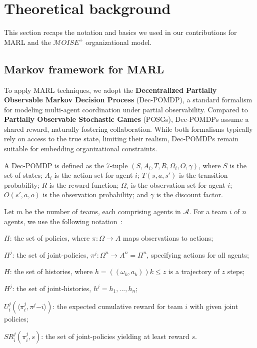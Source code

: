 \documentclass[pdflatex,sn-mathphys-num]{sn-jnl}%
\theoremstyle{thmstyleone}%
\theoremstyle{thmstyletwo}%
\theoremstyle{thmstylethree}%
\begin{document}


\section{Theoretical background}\label{sec:background}

This section recaps the notation and basics we used in our contributions for MARL and the $\mathcal{M}OISE^+$ organizational model.

\subsection{Markov framework for MARL}

To apply MARL techniques, we adopt the \textbf{Decentralized Partially Observable Markov Decision Process} (Dec-POMDP)\cite{Oliehoek2016}, a standard formalism for modeling multi-agent coordination under partial observability. Compared to \textbf{Partially Observable Stochastic Games} (POSGs), Dec-POMDPs assume a shared reward, naturally fostering collaboration\cite{Matignon2007}. While both formalisms typically rely on access to the true state, limiting their realism, Dec-POMDPs remain suitable for embedding organizational constraints.

A Dec-POMDP is defined as the 7-tuple $\left(S, {A_i}, T, R, {\Omega_i}, O, \gamma \right)$, where $S$ is the set of states; $A_i$ is the action set for agent $i$; $T(s, a, s')$ is the transition probability; $R$ is the reward function; $\Omega_i$ is the observation set for agent $i$; $O(s', a, o)$ is the observation probability; and $\gamma$ is the discount factor.

Let $m$ be the number of teams, each comprising agents in $\mathcal{A}$. For a team $i$ of $n$ agents, we use the following notation~\cite{Matignon2007,Yuan2023}:
%
\begin{enumerate*}[label={\roman*)}, itemjoin={; \quad}]
    \item $\Pi$: the set of policies, where $\pi: \Omega \rightarrow A$ maps observations to actions;
    \item $\Pi^j$: the set of joint-policies, $\pi^j: \Omega^n \rightarrow A^n = \Pi^n$, specifying actions for all agents;
    \item $H$: the set of histories, where $h = ((\omega_k, a_k)){k \leq z}$ is a trajectory of $z$ steps;
    \item $H^j$: the set of joint-histories, $h^j = {h_1, ..., h_n}$;
    \item $U^j_i(\langle \pi^j_i, \pi^j{-i} \rangle)$: the expected cumulative reward for team $i$ with given joint policies;
    \item $SR^j_i(\pi^j_i, s)$: the set of joint-policies yielding at least reward $s$.
\end{enumerate*}
\end{document}
